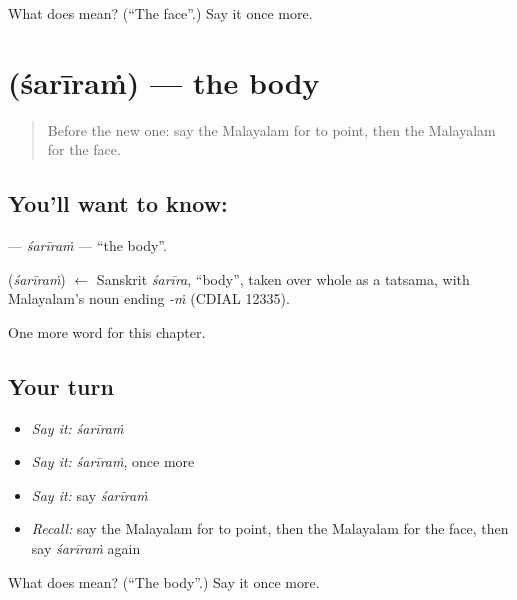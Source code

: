 \begin{tcolorbox}[breakable,colback=teal!4,colframe=teal!35!black,title={Before you move on}]
What does  mean? (\textquotedblleft{}The face\textquotedblright{}.) Say it once more.
\end{tcolorbox}
\section[\texorpdfstring{\ml{ശരീരം} (śarīraṁ)}{ശരീരം (śarīraṁ)}]{ (śarīraṁ) — the body}

\label{lesson:ML-C192-sariram}



\begin{quote}
Before the new one: say the Malayalam for to point, then the Malayalam for the face.
\end{quote}

\subsection*{You'll want to know: }
\textbf{} — \emph{śarīraṁ} — \textquotedblleft{}the body\textquotedblright{}.

\begin{cousinweb}
\textbf{} (\emph{śarīraṁ}) $\leftarrow$ Sanskrit \emph{śarīra}, \textquotedblleft{}body\textquotedblright{}, taken over whole as a tatsama, with Malayalam's noun ending \emph{-ṁ} (CDIAL 12335).
\end{cousinweb}

\begin{grammarlens}[title={What you've built}]
One more word for this chapter.
\end{grammarlens}

\subsection*{Your turn}
\begin{itemize}
\raggedright
  \item \emph{Say it:} \emph{śarīraṁ}
  \item \emph{Say it:} \emph{śarīraṁ}, once more
  \item \emph{Say it:} say \emph{śarīraṁ}
  \item \emph{Recall:} say the Malayalam for to point, then the Malayalam for the face, then say \emph{śarīraṁ} again
\end{itemize}

\begin{tcolorbox}[breakable,colback=teal!4,colframe=teal!35!black,title={Before you move on}]
What does  mean? (\textquotedblleft{}The body\textquotedblright{}.) Say it once more.
\end{tcolorbox}
